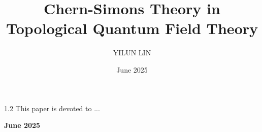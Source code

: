 \documentclass[12pt]{article}
\title{Chern-Simons Theory in Topological Quantum Field Theory}
\author{YILUN LIN}
\date{June 2025}
\numberwithin{equation}{section}
\begin{document}
\doublespacing

\begin{titlepage}
    \centering
    \vspace*{2cm}{\Huge\textbf{\thetitle}\par}
    \vspace{2cm}{\Large\textbf{\theauthor\footnotemark[1]} \par}
    \vspace{0.5cm}
    \begin{spacing}{1.2}
    \Large{This paper is devoted to ...}
    \end{spacing}
    \vspace{2cm}
    \Large\textbf{June 2025}
    \thispagestyle{plain}
\end{titlepage}
\clearpage
{}
\setcounter{page}{2}
\begin{center}
\tableofcontents
\end{center}
\thispagestyle{plain}
\clearpage
\newpage


\newpage

\newpage

\newpage

\newpage

\newpage
{}

\begin{center}

\end{center}
\end{document}
